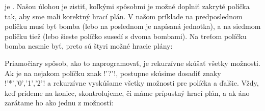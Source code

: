je . Našou úlohou je zistiť, koľkými spôsobmi je možné doplniť zakryté políčka tak, aby sme mali korektný hrací plán. V našom príklade
na predposlednom políčku musí byť bomba (lebo na poslednom je napísaná jednotka), a na siedmom políčku tiež (lebo šieste políčko susedí s dvoma bombami).
Na treťom políčku bomba nesmie byť, preto sú štyri možné hracie plány:





Priamočiary spôsob, ako to naprogramovať, je rekurzívne skúšať všetky možnosti. Ak je na nejakom políčku  znak \prg!'?'!, postupne skúsime dosadiť
znaky \prg!'*','0','1','2'! a rekurzívne vyskúšame všetky možnosti pre políčka  a ďalšie. Vždy, keď prídeme na koniec, skontrolujeme, 
či máme prípustný hrací plán, a ak áno zarátame ho ako jednu z možností:\\

